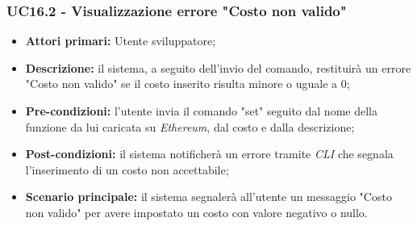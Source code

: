 \subsubsection{UC16.2 - Visualizzazione errore "Costo non valido"}
\begin{itemize}
	\item \textbf{Attori primari:} Utente sviluppatore;
	\item \textbf{Descrizione:} il sistema, a seguito dell'invio del comando, restituirà un errore "Costo non valido" se il costo inserito risulta minore o uguale a 0;
	\item \textbf{Pre-condizioni:}  l'utente invia il comando "set" seguito dal nome della funzione da lui caricata su \textit{Ethereum}, dal costo e dalla descrizione;
	\item \textbf{Post-condizioni:} il sistema notificherà un errore tramite \textit{CLI\glo} che segnala l'inserimento di un costo non accettabile;
	\item \textbf{Scenario principale:} il sistema segnalerà all'utente un messaggio "Costo non valido" per avere impostato un costo con valore negativo o nullo.
\end{itemize}
